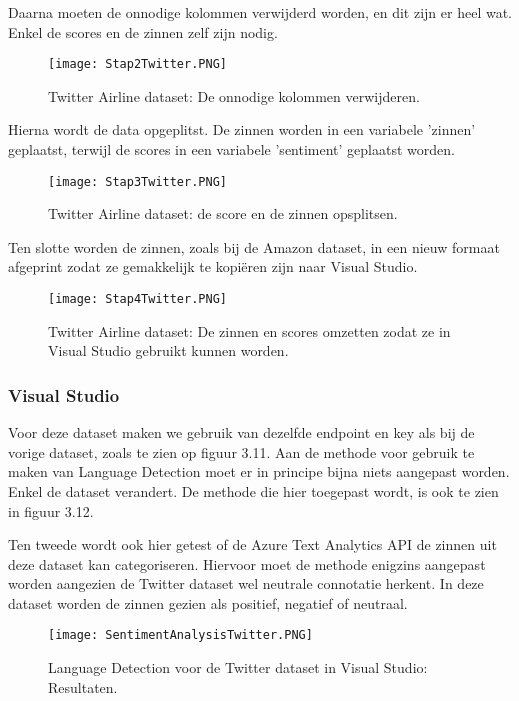 Daarna moeten de onnodige kolommen verwijderd worden, en dit zijn er heel wat. Enkel de scores en de zinnen zelf zijn nodig.
\begin{figure}[!htbp]
    \texttt{[image: Stap2Twitter.PNG]}
    \caption{\label{azurestap2twitter}Twitter Airline dataset: De onnodige kolommen verwijderen.}
\end{figure}
\FloatBarrier 

Hierna wordt de data opgeplitst. De zinnen worden in een variabele 'zinnen' geplaatst, terwijl de scores in een variabele 'sentiment' geplaatst worden. 
\begin{figure}[!htbp]
    \texttt{[image: Stap3Twitter.PNG]}
    \caption{\label{azurestap3twitter}Twitter Airline dataset: de score en de zinnen opsplitsen.}
\end{figure}
\FloatBarrier
Ten slotte worden de zinnen, zoals bij de Amazon dataset, in een nieuw formaat afgeprint zodat ze gemakkelijk te kopiëren zijn naar Visual Studio. 
\begin{figure}[!htbp]
    \texttt{[image: Stap4Twitter.PNG]}
    \caption{\label{azurestap4twitter}Twitter Airline dataset: De zinnen en scores omzetten zodat ze in Visual Studio gebruikt kunnen worden.}
\end{figure}
\FloatBarrier 

\subsubsection{Visual Studio}
\label{twitterdatasetvisualstudioazure}
Voor deze dataset maken we gebruik van dezelfde endpoint en key als bij de vorige dataset, zoals te zien op figuur 3.11. Aan de methode voor gebruik te maken van Language Detection moet er in principe bijna niets aangepast worden. Enkel de dataset verandert. De methode die hier toegepast wordt, is ook te zien in figuur 3.12.

Ten tweede wordt ook hier getest of de Azure Text Analytics API de zinnen uit deze dataset kan categoriseren. Hiervoor moet de methode enigzins aangepast worden aangezien de Twitter dataset wel neutrale connotatie herkent. In deze dataset worden de zinnen gezien als positief, negatief of neutraal. 

\begin{figure}[!htbp]
    \texttt{[image: SentimentAnalysisTwitter.PNG]}
    \caption{\label{azuresentimentanalysistwitter}Language Detection voor de Twitter dataset in Visual Studio: Resultaten.}
\end{figure}
\FloatBarrier 


